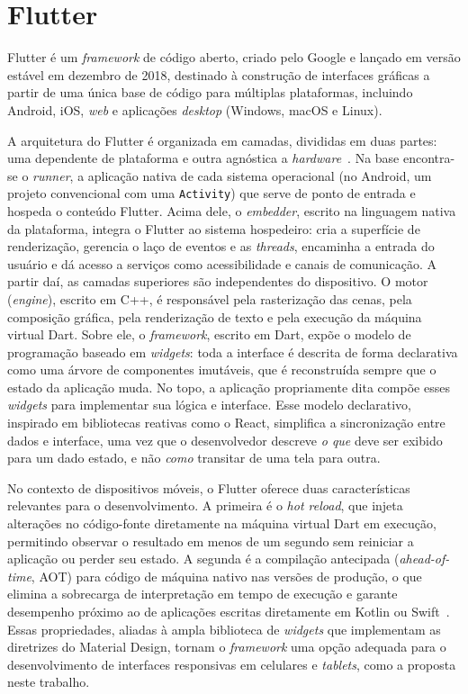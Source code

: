 \section{Flutter}

Flutter é um \textit{framework} de código aberto, criado pelo Google e lançado em versão estável em dezembro de 2018, destinado à construção de interfaces gráficas a partir de uma única base de código para múltiplas plataformas, incluindo Android, iOS, \textit{web} e aplicações \textit{desktop} (Windows, macOS e Linux).

A arquitetura do Flutter é organizada em camadas, divididas em duas partes: uma dependente de plataforma e outra agnóstica a \textit{hardware}~\cite{flutter_docs}. Na base encontra-se o \textit{runner}, a aplicação nativa de cada sistema operacional (no Android, um projeto convencional com uma \texttt{Activity}) que serve de ponto de entrada e hospeda o conteúdo Flutter. Acima dele, o \textit{embedder}, escrito na linguagem nativa da plataforma, integra o Flutter ao sistema hospedeiro: cria a superfície de renderização, gerencia o laço de eventos e as \textit{threads}, encaminha a entrada do usuário e dá acesso a serviços como acessibilidade e canais de comunicação. A partir daí, as camadas superiores são independentes do dispositivo. O motor (\textit{engine}), escrito em C++, é responsável pela rasterização das cenas, pela composição gráfica, pela renderização de texto e pela execução da máquina virtual Dart. Sobre ele, o \textit{framework}, escrito em Dart, expõe o modelo de programação baseado em \textit{widgets}: toda a interface é descrita de forma declarativa como uma árvore de componentes imutáveis, que é reconstruída sempre que o estado da aplicação muda. No topo, a aplicação propriamente dita compõe esses \textit{widgets} para implementar sua lógica e interface. Esse modelo declarativo, inspirado em bibliotecas reativas como o React, simplifica a sincronização entre dados e interface, uma vez que o desenvolvedor descreve \textit{o que} deve ser exibido para um dado estado, e não \textit{como} transitar de uma tela para outra.

No contexto de dispositivos móveis, o Flutter oferece duas características relevantes para o desenvolvimento. A primeira é o \textit{hot reload}, que injeta alterações no código-fonte diretamente na máquina virtual Dart em execução, permitindo observar o resultado em menos de um segundo sem reiniciar a aplicação ou perder seu estado. A segunda é a compilação antecipada (\textit{ahead-of-time}, AOT) para código de máquina nativo nas versões de produção, o que elimina a sobrecarga de interpretação em tempo de execução e garante desempenho próximo ao de aplicações escritas diretamente em Kotlin ou Swift~\cite{flutter_docs}. Essas propriedades, aliadas à ampla biblioteca de \textit{widgets} que implementam as diretrizes do Material Design, tornam o \textit{framework} uma opção adequada para o desenvolvimento de interfaces responsivas em celulares e \textit{tablets}, como a proposta neste trabalho.

